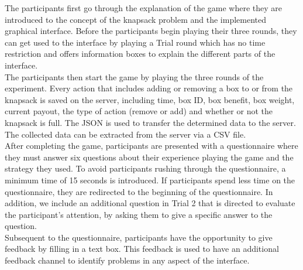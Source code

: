 The participants first go through the explanation of the game where they are introduced to the concept of the knapsack problem and the implemented graphical interface. 
Before the participants begin playing their three rounds, they can get used to the interface by playing a Trial round which has no time restriction and offers information boxes to explain the different parts of the interface.\\
The participants then start the game by playing the three rounds of the experiment. Every action that includes adding or removing a box to or from the knapsack is saved on the server, including time, box ID, box benefit, box weight, current payout, the type of action (remove or add) and whether or not the knapsack is full.
The \ac{JSON} is used to transfer the determined data to the server. The collected data can be extracted from the server via a \ac{CSV} file.\\
After completing the game, participants are presented with a questionnaire where they must answer six questions about their experience playing the game and the strategy they used. To avoid participants rushing through the questionnaire, a minimum time of 15 seconds is introduced. If participants spend less time on the questionnaire, they are redirected to the beginning of the questionnaire. In addition, we include an additional question in Trial 2 that is directed to evaluate the participant's attention, by asking them to give a specific answer to the question.\\
Subsequent to the questionnaire, participants have the opportunity to give feedback by filling in a text box. This feedback is used to have an additional feedback channel to identify problems in any aspect of the interface.

